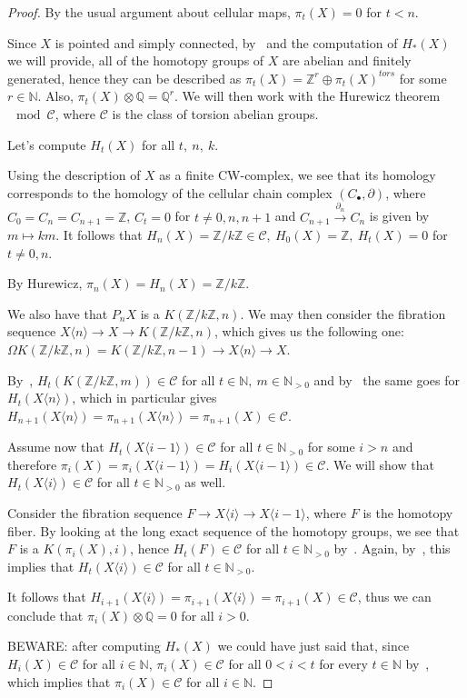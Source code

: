 \documentclass{article}
\newcommand{\numberset}{\mathbb}
\newcommand{\N}{\numberset{N}}
\newcommand{\Z}{\numberset{Z}}
\newcommand{\Q}{\numberset{Q}}
\begin{document}
\begin{proof}    
    By the usual argument about cellular maps, $\pi_t(X)=0$ for $t<n$.
    
    Since $X$ is pointed and simply connected, by~\cite[thm. 12.1]{HM19} and the
    computation of $H_*(X)$ we will provide,
    all of the homotopy groups of $X$ are abelian and finitely generated, hence
    they can be described as $\pi_t(X)=\Z^r\oplus\pi_t(X)^{tors}$ for some
    $r\in\N$. Also, $\pi_t(X)\otimes\Q=\Q^r$. We will then work with the
    Hurewicz theorem$\mod\mathcal{C}$, where $\mathcal{C}$ is the class of
    torsion abelian groups.
    
    Let's compute $H_t(X)$ for all $t,\ n,\ k$.

    Using the description of $X$ as a finite CW-complex, we see that its
    homology corresponds to the homology of the cellular chain complex
    $(C_\bullet,\partial)$, where $C_0=C_n=C_{n+1}=\Z$, $C_t=0$ for
    $t\neq 0,n,n+1$ and $C_{n+1}\xrightarrow{\partial_n}C_n$ is given by
    $m\mapsto km$. It follows that $H_n(X)=\Z/k\Z\in\mathcal{C},\ H_0(X)=\Z,\
    H_t(X)=0$ for $t\neq 0,n$.

    By Hurewicz, $\pi_n(X)=H_n(X)=\Z/k\Z$.

    We also have that $P_nX$ is a $K(\Z/k\Z,n)$. We may then consider the
    fibration sequence $X\langle n\rangle\rightarrow X\rightarrow K(\Z/k\Z,n)$,
    which gives us the following one: $\Omega
    K(\Z/k\Z,n)=K(\Z/k\Z,n-1)\rightarrow X\langle n\rangle\rightarrow X$.

    By~\cite[lemma 13.16]{HM19}, $H_t(K(\Z/k\Z,m))\in\mathcal{C}$ for all
    $t\in\N,\ m\in\N_{>0}$ and by~\cite[lemma 13.15]{HM19} the same goes for
    $H_t(X\langle n\rangle)$, which in particular gives
    $H_{n+1}(X\langle n\rangle)=\pi_{n+1}(X\langle
    n\rangle)=\pi_{n+1}(X)\in\mathcal{C}$.

    Assume now that $H_t(X\langle i-1\rangle)\in\mathcal{C}$ for all
    $t\in\N_{>0}$ for some $i>n$ and therefore $\pi_i(X)=\pi_i(X\langle
    i-1\rangle)=H_i(X\langle i-1\rangle)\in\mathcal{C}$. We will show that
    $H_t(X\langle i\rangle)\in\mathcal{C}$ for all $t\in\N_{>0}$ as well.

    Consider the fibration sequence $F\rightarrow X\langle i\rangle\rightarrow
    X\langle i-1\rangle$, where $F$ is the homotopy fiber. By looking at the
    long exact sequence of the homotopy groups, we see that $F$ is a
    $K(\pi_i(X),i)$, hence $H_t(F)\in\mathcal{C}$ for all $t\in\N_{>0}$
    by~\cite[lemma 13.16]{HM19}. Again, by~\cite[lemma 13.15]{HM19}, this
    implies that $H_t(X\langle i\rangle)\in\mathcal{C}$ for all $t\in\N_{>0}$.
    
    It follows that $H_{i+1}(X\langle i\rangle)=\pi_{i+1}(X\langle
    i\rangle)=\pi_{i+1}(X)\in\mathcal{C}$, thus we can conclude that
    $\pi_i(X)\otimes\Q=0$ for all $i>0$.

    BEWARE: after computing $H_*(X)$ we could have just said that, since
    $H_i(X)\in\mathcal{C}$ for all $i\in\N$, $\pi_i(X)\in\mathcal{C}$ for all
    $0<i<t$ for every $t\in\N$ by~\cite[thm. 13.17]{HM19}, which implies that
    $\pi_i(X)\in\mathcal{C}$ for all $i\in\N$.
\end{proof}

\printbibliography
\end{document}

